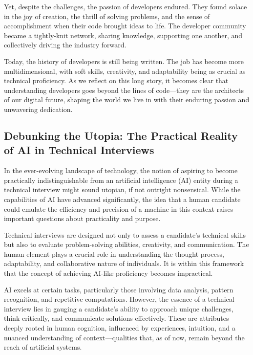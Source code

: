 \documentclass[
    a4paper, %
    10pt, %
    unnumberedsections, %
    twoside, %
]{LTJournalArticle}
\begin{document}
Yet, despite the challenges, the passion of developers endured. They found solace in the joy of creation, the thrill of solving problems, and the sense of accomplishment when their code brought ideas to life. The developer community became a tightly-knit network, sharing knowledge, supporting one another, and collectively driving the industry forward.

Today, the history of developers is still being written. The job has become more multidimensional, with soft skills, creativity, and adaptability being as crucial as technical proficiency. As we reflect on this long story, it becomes clear that understanding developers goes beyond the lines of code—they are the architects of our digital future, shaping the world we live in with their enduring passion and unwavering dedication.



\subsection{Debunking the Utopia: The Practical Reality of AI in Technical Interviews}

In the ever-evolving landscape of technology, the notion of aspiring to become practically indistinguishable from an artificial intelligence (AI) entity during a technical interview might sound utopian, if not outright nonsensical. While the capabilities of AI have advanced significantly, the idea that a human candidate could emulate the efficiency and precision of a machine in this context raises important questions about practicality and purpose.

Technical interviews are designed not only to assess a candidate's technical skills but also to evaluate problem-solving abilities, creativity, and communication. The human element plays a crucial role in understanding the thought process, adaptability, and collaborative nature of individuals. It is within this framework that the concept of achieving AI-like proficiency becomes impractical.

AI excels at certain tasks, particularly those involving data analysis, pattern recognition, and repetitive computations. However, the essence of a technical interview lies in gauging a candidate's ability to approach unique challenges, think critically, and communicate solutions effectively. These are attributes deeply rooted in human cognition, influenced by experiences, intuition, and a nuanced understanding of context—qualities that, as of now, remain beyond the reach of artificial systems.
\end{document}
